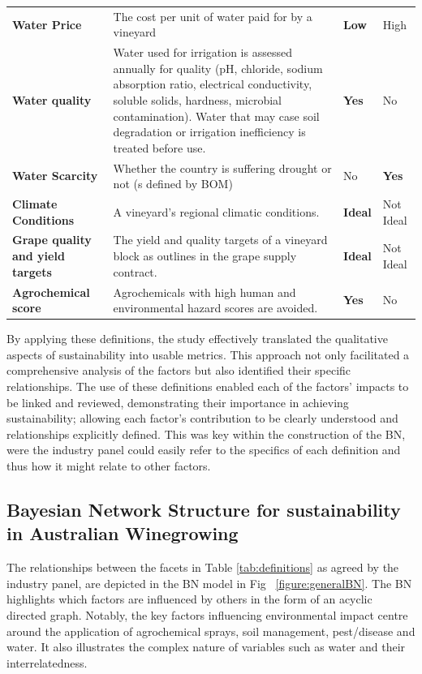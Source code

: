 \begin{table}[h]
\begin{tabular}{@{}llll@{}}
    \textbf{Water Price} & The cost per unit of water paid for by a vineyard & \textbf{Low} & High \\
    \textbf{Water quality} & Water used for irrigation is assessed annually for quality (pH, chloride, sodium absorption ratio, electrical conductivity, soluble solids, hardness, microbial contamination). Water that may case soil degradation or irrigation inefficiency is treated before use. & \textbf{Yes} & No \\
    \textbf{Water Scarcity} & Whether the country is suffering drought or not (s defined by BOM) & No & \textbf{Yes} \\
    \textbf{Climate Conditions} & A vineyard’s regional climatic conditions. & \textbf{Ideal} & Not Ideal \\
    \textbf{Grape quality and yield targets} & The yield and quality targets of a vineyard block as outlines in the grape supply contract. & \textbf{Ideal} & Not Ideal \\
    \textbf{Agrochemical score} & Agrochemicals with high human and environmental hazard scores are avoided. & \textbf{Yes} & No \\ \bottomrule
    \end{tabular}
\end{table}

By applying these definitions, the study effectively translated the qualitative aspects of sustainability into usable metrics. This approach not only facilitated a comprehensive analysis of the factors but also identified their specific relationships. The use of these definitions enabled each of the factors' impacts to be linked and reviewed, demonstrating their importance in achieving sustainability; allowing each factor's contribution to be clearly understood and relationships explicitly defined. This was key within the construction of the BN, were the industry panel could easily refer to the specifics of each definition and thus how it might relate to other factors.

\subsection{Bayesian Network Structure for sustainability in Australian Winegrowing}

The relationships between the facets in Table \ref{tab:definitions}  as agreed by the industry panel, are depicted in the BN model in Fig ~\ref{figure:generalBN}. The BN highlights which factors are influenced by others in the form of an acyclic directed graph. Notably, the key factors influencing environmental impact centre around the application of agrochemical sprays, soil management, pest/disease and water. It also illustrates the complex nature of variables such as water and their interrelatedness.

